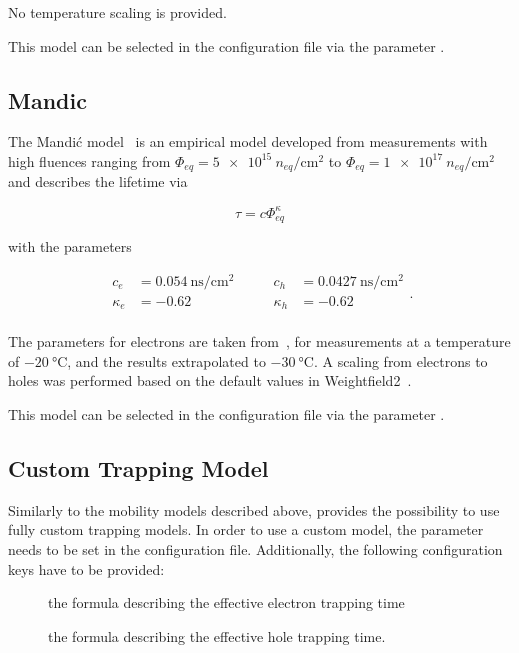 No temperature scaling is provided.

This model can be selected in the configuration file via the parameter .

\subsection{Mandic}

The Mandi\'{c} model~\cite{Mandic} is an empirical model developed from measurements with high fluences ranging from  $\Phi_{eq} = \SI{5e15}{n_{eq} \per \cm^2}$ to  $\Phi_{eq} = \SI{1e17}{n_{eq} \per \cm^2}$ and describes the lifetime via

\begin{equation*}
    \tau = c\Phi_{eq}^{\kappa}
\end{equation*}

with the parameters

\begin{equation*}
    \begin{split}
        c_e &= \SI{0.054}{\ns \per \cm^2} \\
        \kappa_e   &= -0.62 \\
    \end{split}
    \qquad
    \begin{split}
        c_h &= \SI{0.0427}{\ns \per \cm^2} \\
        \kappa_h   &= -0.62 \\
    \end{split}.
\end{equation*}

The parameters for electrons are taken from~\cite{Mandic}, for measurements at a temperature of $\SI{-20}{\celsius}$, and the results extrapolated to $\SI{-30}{\celsius}$.
A scaling from electrons to holes was performed based on the default values in Weightfield2~\cite{Weightfield2}.

This model can be selected in the configuration file via the parameter .

\subsection{Custom Trapping Model}

Similarly to the mobility models described above, \apsq provides the possibility to use fully custom trapping models.
In order to use a custom model, the parameter  needs to be set in the configuration file.
Additionally, the following configuration keys have to be provided:
\begin{description}
    \item[] the formula describing the effective electron trapping time
    \item[] the formula describing the effective hole trapping time.
\end{description}

